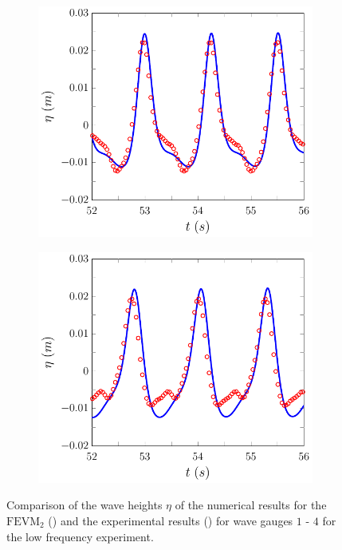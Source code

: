 \begin{figure}
\begin{subfigure}{0.5\textwidth}
		\vspace{0.5cm}
	\end{subfigure}
	\begin{subfigure}{0.5\textwidth}
		\includegraphics[width=\textwidth]{./chp6/figures/Experiment/Beji/sh/FEVMWG3.pdf}
		\vspace{0.5cm}
	\end{subfigure}%
	\begin{subfigure}{0.5\textwidth}
		\includegraphics[width=\textwidth]{./chp6/figures/Experiment/Beji/sh/FEVMWG4.pdf}
		\vspace{0.5cm}
	\end{subfigure}
	\caption{Comparison of the wave heights $\eta$ of the numerical results for the $\text{FEVM}_2$ ({\color{blue}\solidrule}) and the experimental results () for wave gauges $1$ - $4$ for the low frequency experiment.}
	\label{fig:BejishWG1to4FEVM}
\end{figure}

